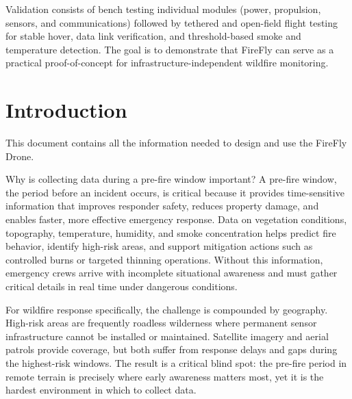 \documentclass[journal, onecolumn]{IEEEtran}
\begin{document}
\vspace{0.5em}

Validation consists of bench testing individual modules (power, propulsion,
sensors, and communications) followed by tethered and open-field flight
testing for stable hover, data link verification, and threshold-based smoke
and temperature detection. The goal is to demonstrate that FireFly can serve
as a practical proof-of-concept for infrastructure-independent wildfire
monitoring.

\clearpage

\section{Introduction}

This document contains all the information needed to design and use the FireFly Drone.

\vspace{1em}

Why is collecting data during a pre-fire window important? A pre-fire window, the period before an incident occurs, is critical because it provides time-sensitive information that improves responder safety, reduces property damage, and enables faster, more effective emergency response. Data on vegetation conditions, topography, temperature, humidity, and smoke concentration helps predict fire behavior, identify high-risk areas, and support mitigation actions such as controlled burns or targeted thinning operations. Without this information, emergency crews arrive with incomplete situational awareness and must gather critical details in real time under dangerous conditions.

\vspace{1em}

For wildfire response specifically, the challenge is compounded by geography. High-risk areas are frequently roadless wilderness where permanent sensor infrastructure cannot be installed or maintained. Satellite imagery and aerial patrols provide coverage, but both suffer from response delays and gaps during the highest-risk windows. The result is a critical blind spot: the pre-fire period in remote terrain is precisely where early awareness matters most, yet it is the hardest environment in which to collect data.

\vspace{1em}
\end{document}
